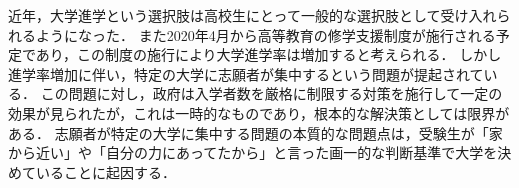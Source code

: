 




近年，大学進学という選択肢は高校生にとって一般的な選択肢として受け入れられるようになった．
また2020年4月から高等教育の修学支援制度が施行される予定であり，この制度の施行により大学進学率は増加すると考えられる．
しかし進学率増加に伴い，特定の大学に志願者が集中するという問題が提起されている．
この問題に対し，政府は入学者数を厳格に制限する対策を施行して一定の効果が見られたが，これは一時的なものであり，根本的な解決策としては限界がある．
志願者が特定の大学に集中する問題の本質的な問題点は，受験生が「家から近い」や「自分の力にあってたから」と言った画一的な判断基準で大学を決めていることに起因する．

